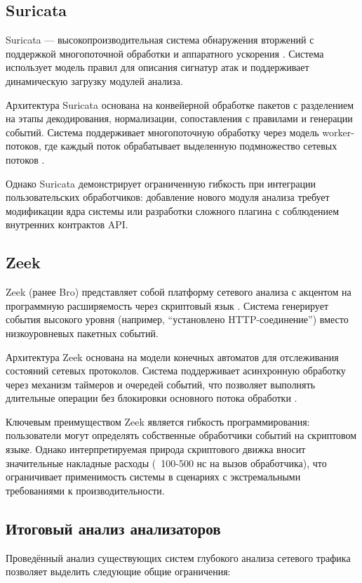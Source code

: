 \documentclass[12pt,a4paper]{report}
\begin{document}
\subsection{Suricata}
Suricata — высокопроизводительная система обнаружения вторжений с поддержкой многопоточной обработки и аппаратного ускорения \cite{suricata2023}. Система использует модель правил для описания сигнатур атак и поддерживает динамическую загрузку модулей анализа.

Архитектура Suricata основана на конвейерной обработке пакетов с разделением на этапы декодирования, нормализации, сопоставления с правилами и генерации событий. Система поддерживает многопоточную обработку через модель worker-потоков, где каждый поток обрабатывает выделенную подмножество сетевых потоков \cite{regulinski2019suricata}.

Однако Suricata демонстрирует ограниченную гибкость при интеграции пользовательских обработчиков: добавление нового модуля анализа требует модификации ядра системы или разработки сложного плагина с соблюдением внутренних контрактов API.

\subsection{Zeek}
Zeek (ранее Bro) представляет собой платформу сетевого анализа с акцентом на программную расширяемость через скриптовый язык \cite{paxson1999bro}. Система генерирует события высокого уровня (например, ``установлено HTTP-соединение'') вместо низкоуровневых пакетных событий.

Архитектура Zeek основана на модели конечных автоматов для отслеживания состояний сетевых протоколов. Система поддерживает асинхронную обработку через механизм таймеров и очередей событий, что позволяет выполнять длительные операции без блокировки основного потока обработки \cite{sommer2010outside}.

Ключевым преимуществом Zeek является гибкость программирования: пользователи могут определять собственные обработчики событий на скриптовом языке. Однако интерпретируемая природа скриптового движка вносит значительные накладные расходы (~100-500 нс на вызов обработчика), что ограничивает применимость системы в сценариях с экстремальными требованиями к производительности.

\subsection{Итоговый анализ анализаторов}
Проведённый анализ существующих систем глубокого анализа сетевого трафика позволяет выделить следующие общие ограничения:
\end{document}
